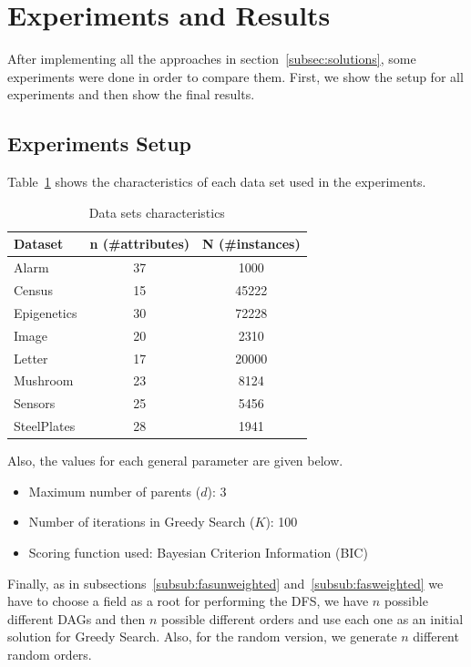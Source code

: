 \section{Experiments and Results}
\label{sec:experiments}

After implementing all the approaches in section~\ref{subsec:solutions}, some experiments were done in order to compare them. First, we show the setup for all experiments and then show the final results.

\subsection{Experiments Setup}
\label{subsec:configuration}
	Table~\ref{tab:datasets} shows the characteristics of each data set used in the experiments.
	\begin{table}[ h ]
		\centering
		\begin{tabular}{ | l | c | c | }
			\hline
			Dataset & n (\#attributes) & N (\#instances) \\ \hline
			Alarm & 37 & 1000 \\ \hline
			Census & 15 & 45222 \\ \hline
			Epigenetics & 30 & 72228 \\ \hline
			Image & 20 & 2310 \\ \hline
			Letter & 17 & 20000 \\ \hline
			Mushroom & 23 & 8124 \\ \hline
			Sensors & 25 & 5456 \\ \hline
			SteelPlates & 28 & 1941 \\ \hline
		\end{tabular}
		\caption{Data sets characteristics}
		\label{tab:datasets}
	\end{table}
	Also, the values for each general parameter are given below.
	\begin{itemize}
		\item Maximum number of parents ($d$): 3
		\item Number of iterations in Greedy Search ($K$): 100
		\item Scoring function used: Bayesian Criterion Information (BIC)
	\end{itemize}
	Finally, as in subsections~\ref{subsub:fasunweighted} and~\ref{subsub:fasweighted} we have to choose a field as a root for performing the DFS, we have $n$ possible different DAGs and then $n$ possible different orders and use each one as an initial solution for Greedy Search. Also, for the random version, we generate $n$ different random orders.

